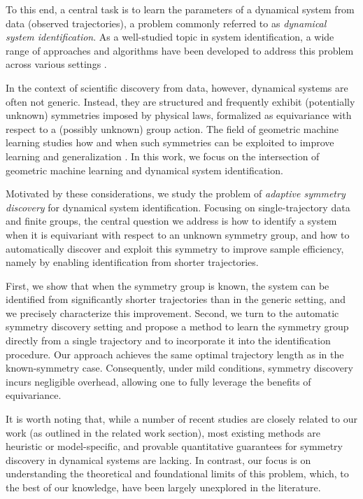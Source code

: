 \documentclass[11pt]{article}
\theoremstyle{plain}
\theoremstyle{definition}
\theoremstyle{remark}
\begin{document}
To this end, a central task is to learn the parameters of a dynamical system from data (observed trajectories), a problem commonly referred to as \emph{dynamical system identification}. As a well-studied topic in system identification, a wide range of approaches and algorithms have been developed to address this problem across various settings \citep{van2012subspace, isermann2011identification}.

In the context of scientific discovery from data, however, dynamical systems are often not generic. Instead, they are structured and frequently exhibit (potentially unknown) symmetries imposed by physical laws, formalized as equivariance with respect to a (possibly unknown) group action. The field of geometric machine learning studies how and when such symmetries can be exploited to improve learning and generalization \citep{bronstein2021geometric, weber2025geometric}. In this work, we focus on the intersection of geometric machine learning and dynamical system identification.




Motivated by these considerations, we study the problem of \emph{adaptive symmetry discovery} for dynamical system identification. Focusing on single-trajectory data and finite groups, the central question we address is how to identify a system when it is equivariant with respect to an unknown symmetry group, and how to automatically discover and exploit this symmetry to improve sample efficiency, namely by enabling identification from shorter trajectories.

First, we show that when the symmetry group is known, the system can be identified from significantly shorter trajectories than in the generic setting, and we precisely characterize this improvement. Second, we turn to the automatic symmetry discovery setting and propose a method to learn the symmetry group directly from a single trajectory and to incorporate it into the identification procedure. Our approach achieves the same optimal trajectory length as in the known-symmetry case. Consequently, under mild conditions, symmetry discovery incurs negligible overhead, allowing one to fully leverage the benefits of equivariance.


It is worth noting that, while a number of recent studies are closely related to our work (as outlined in the related work section), most existing methods are heuristic or model-specific, and provable quantitative guarantees for symmetry discovery in dynamical systems are lacking. In contrast, our focus is on understanding the theoretical and foundational limits of this problem, which, to the best of our knowledge, have been largely unexplored in the literature.
\end{document}
